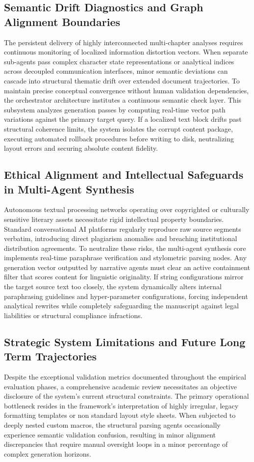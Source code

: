 \subsection{Semantic Drift Diagnostics and Graph Alignment Boundaries}
The persistent delivery of highly interconnected multi-chapter analyses requires continuous monitoring of localized information distortion vectors. When separate sub-agents pass complex character state representations or analytical indices across decoupled communication interfaces, minor semantic deviations can cascade into structural thematic drift over extended document trajectories. To maintain precise conceptual convergence without human validation dependencies, the orchestrator architecture institutes a continuous semantic check layer. This subsystem analyzes generation passes by computing real-time vector path variations against the primary target query. If a localized text block drifts past structural coherence limits, the system isolates the corrupt content package, executing automated rollback procedures before writing to disk, neutralizing layout errors and securing absolute content fidelity.

\subsection{Ethical Alignment and Intellectual Safeguards in Multi-Agent Synthesis}
Autonomous textual processing networks operating over copyrighted or culturally sensitive literary assets necessitate rigid intellectual property boundaries. Standard conversational AI platforms regularly reproduce raw source segments verbatim, introducing direct plagiarism anomalies and breaching institutional distribution agreements. To neutralize these risks, the multi-agent synthesis core implements real-time paraphrase verification and stylometric parsing nodes. Any generation vector outputted by narrative agents must clear an active containment filter that scores content for linguistic originality. If string configurations mirror the target source text too closely, the system dynamically alters internal paraphrasing guidelines and hyper-parameter configurations, forcing independent analytical rewrites while completely safeguarding the manuscript against legal liabilities or structural compliance infractions.

\subsection{Strategic System Limitations and Future Long Term Trajectories}
Despite the exceptional validation metrics documented throughout the empirical evaluation phases, a comprehensive academic review necessitates an objective disclosure of the system's current structural constraints. The primary operational bottleneck resides in the framework's interpretation of highly irregular, legacy formatting templates or non standard layout style sheets. When subjected to deeply nested custom macros, the structural parsing agents occasionally experience semantic validation confusion, resulting in minor alignment discrepancies that require manual oversight loops in a minor percentage of complex generation horizons.

